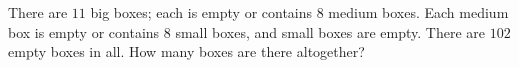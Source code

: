 There are $11$ big boxes; each is empty or contains $8$ medium boxes. Each medium box is empty or contains $8$ small boxes, and small boxes are empty. There are $102$ empty boxes in all. How many boxes are there altogether?
